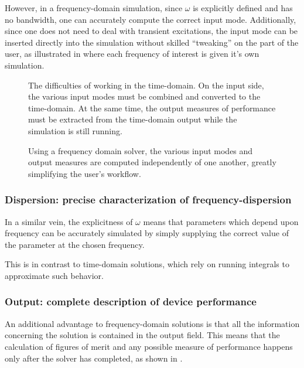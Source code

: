 \documentclass{article}
\begin{document}
However, in a frequency-domain simulation, 
    since $\omega$ is explicitly defined and has no bandwidth,
    one can accurately compute the correct input mode.
Additionally, since one does not need to deal with transient excitations,
    the input mode can be inserted directly into the simulation
    without skilled ``tweaking'' on the part of the user,
    as illustrated in 
    where each frequency of interest is given it's own simulation.
 
\begin{figure}[ht]\begin{center}

\caption{The difficulties of working in the time-domain.
        On the input side, the various input modes must be
            combined and converted to the time-domain.
        At the same time, the output measures of performance 
            must be extracted from the time-domain output
            while the simulation is still running.}
\label{fig:time domain diagram}
\end{center} \end{figure}

\begin{figure}[ht]\begin{center}

\caption{Using a frequency domain solver,
            the various input modes and output measures
            are computed independently of one another,
            greatly simplifying the user's workflow.}
\label{fig:frequency domain diagram}
\end{center} \end{figure}

\subsubsection{Dispersion: precise characterization of frequency-dispersion}
In a similar vein, the explicitness of $\omega$ means that
    parameters which depend upon frequency can be accurately simulated
    by simply supplying the correct value of the parameter at the 
    chosen frequency.

This is in contrast to time-domain solutions,
    which rely on running integrals to approximate such behavior.
    
\subsubsection{Output: complete description of device performance}
An additional advantage to frequency-domain solutions
    is that all the information concerning the solution
    is contained in the output field.
This means that the calculation of figures of merit and 
    any possible measure of performance happens only
    after the solver has completed, 
    as shown in .
\end{document}
